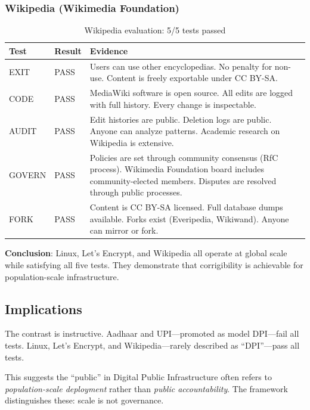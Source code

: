 \documentclass[11pt,a4paper]{article}
\newcommand{\tpass}{\textcolor{passgreen}{PASS}}
\begin{document}
\subsubsection{Wikipedia (Wikimedia Foundation)}

\begin{table}[htbp]
\centering
\begin{tabular}{@{}llp{7cm}@{}}
\toprule
\textbf{Test} & \textbf{Result} & \textbf{Evidence} \\
\midrule
EXIT & \tpass & Users can use other encyclopedias. No penalty for non-use. Content is freely exportable under CC BY-SA. \\
\addlinespace
CODE & \tpass & MediaWiki software is open source. All edits are logged with full history. Every change is inspectable. \\
\addlinespace
AUDIT & \tpass & Edit histories are public. Deletion logs are public. Anyone can analyze patterns. Academic research on Wikipedia is extensive. \\
\addlinespace
GOVERN & \tpass & Policies are set through community consensus (RfC process). Wikimedia Foundation board includes community-elected members. Disputes are resolved through public processes. \\
\addlinespace
FORK & \tpass & Content is CC BY-SA licensed. Full database dumps available. Forks exist (Everipedia, Wikiwand). Anyone can mirror or fork. \\
\bottomrule
\end{tabular}
\caption{Wikipedia evaluation: 5/5 tests passed}
\end{table}

\textbf{Conclusion}: Linux, Let's Encrypt, and Wikipedia all operate at global scale while satisfying all five tests. They demonstrate that corrigibility is achievable for population-scale infrastructure.

\subsection{Implications}

The contrast is instructive. Aadhaar and UPI---promoted as model DPI---fail all tests. Linux, Let's Encrypt, and Wikipedia---rarely described as ``DPI''---pass all tests.

This suggests the ``public'' in Digital Public Infrastructure often refers to \textit{population-scale deployment} rather than \textit{public accountability}. The framework distinguishes these: scale is not governance.
\end{document}
